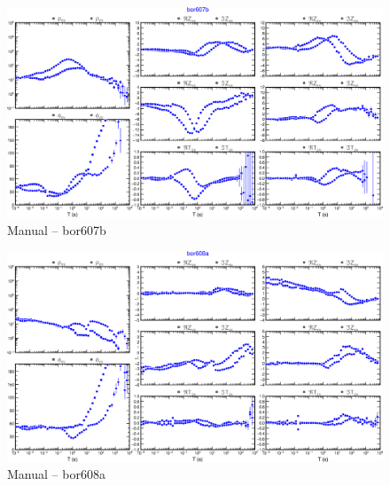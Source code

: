     \begin{figure}[H]
        \caption{Manual -- bor607b}
            \begin{center}
                \includegraphics[width=16cm]{texto/figura/sites/M-bor607b.png}
            \end{center}
    \end{figure}
    
    \begin{figure}[H]
        \caption{Manual -- bor608a}
            \begin{center}
                \includegraphics[width=16cm]{texto/figura/sites/M-bor608a.png}
            \end{center}
    \end{figure}
    
